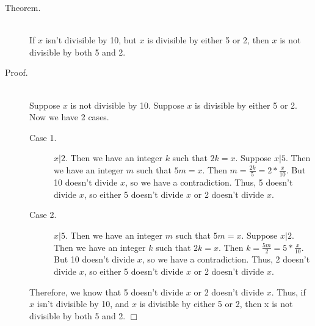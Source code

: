 \documentclass{article}
\begin{document}
\begin{description}
    \item[Theorem.] \hfill \\
        If $x$ isn't divisible by 10, but $x$ is divisible by
        either 5 or 2, then $x$ is not divisible by both 5 and 2.
    \item[Proof.] \hfill \\
        Suppose $x$ is not divisible by 10. Suppose $x$ is
        divisible by either 5 or 2. Now we have 2 cases.
    \begin{description}
        \item[Case 1.] $x | 2$. Then we have an integer $k$ such that $2k = x$.
            Suppose $x | 5$. Then we have an integer $m$ such that $5m = x$.
            Then $m = \frac{2k}{5} = 2 * \frac{x}{10}$. But 10 doesn't divide
            $x$, so we have a contradiction. Thus, 5 doesn't divide $x$, so
            either 5 doesn't divide $x$ or 2 doesn't divide $x$.
        \item[Case 2.] $x | 5$. Then we have an integer $m$ such that $5m = x$.
            Suppose $x | 2$. Then we have an integer $k$ such that $2k = x$.
            Then $k = \frac{5m}{2} = 5 * \frac{x}{10}$. But 10 doesn't divide
            $x$, so we have a contradiction. Thus, 2 doesn't divide $x$, so
            either 5 doesn't divide $x$ or 2 doesn't divide $x$.
    \end{description}
Therefore, we know that 5 doesn't divide $x$ or 2 doesn't divide $x$. Thus, if
$x$ isn't divisible by 10, and $x$ is divisible by either 5 or 2, then x is
not divisible by both 5 and 2. \hfill \ensuremath{\Box}
\end{description}
\end{document}
